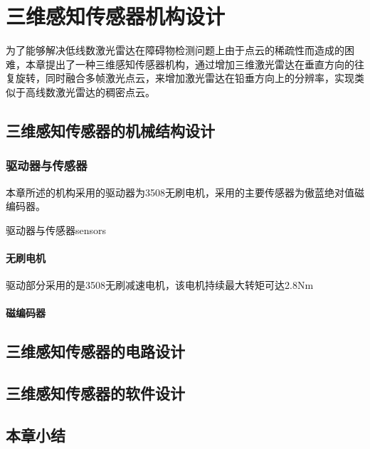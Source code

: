 
\chapter{三维感知传感器机构设计}
为了能够解决低线数激光雷达在障碍物检测问题上由于点云的稀疏性而造成的困难，本章提出了一种三维感知传感器机构，通过增加三维激光雷达在垂直方向的往复旋转，同时融合多帧激光点云，来增加激光雷达在铅垂方向上的分辨率，实现类似于高线数激光雷达的稠密点云。

\section{三维感知传感器的机械结构设计}

\subsection{驱动器与传感器}
本章所述的机构采用的驱动器为3508无刷电机，采用的主要传感器为傲蓝绝对值磁编码器。

\begin{pics}[htbp]{驱动器与传感器}{sensors}
\end{pics}

\subsubsection{无刷电机}
驱动部分采用的是3508无刷减速电机，该电机持续最大转矩可达2.8Nm
\subsubsection{磁编码器}


\section{三维感知传感器的电路设计}

\section{三维感知传感器的软件设计}

\section{本章小结}